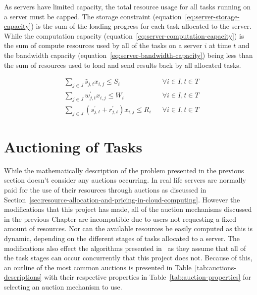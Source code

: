 As servers have limited capacity, the total resource usage for all tasks running on a server must be capped.
The storage constraint (equation~\eqref{eq:server-storage-capacity}) is the sum of the loading progress for
each task allocated to the server. While the computation capacity (equation~\eqref{eq:server-computation-capacity}) is
the sum of compute resources used by all of the tasks on a server $i$ at time $t$ and the bandwidth capacity
(equation~\eqref{eq:server-bandwidth-capacity}) being less than the sum of resources used to load and send results back
by all allocated tasks.

\begin{align}
    & \sum_{j \in J} \hat{s}_{j,t} x_{i,j} \leq S_i && \forall{i \in I, t \in T} \label{eq:server-storage-capacity} \\
    & \sum_{j \in J} w^{'}_{j,t} x_{i,j} \leq W_i && \forall{i \in I, t \in T} \label{eq:server-computation-capacity} \\
    & \sum_{j \in J} (s^{'}_{j,t} + r^{'}_{j,t}) x_{i,j} \leq R_i && \forall{i \in I, t \in T} \label{eq:server-bandwidth-capacity}
\end{align}

\section{Auctioning of Tasks}
\label{sec:auctioning-of-tasks}
While the mathematically description of the problem presented in the previous section doesn't consider any auctions
occurring. In real life servers are normally paid for the use of their resources through auctions as discussed in
Section~\ref{sec:resource-allocation-and-pricing-in-cloud-computing}. However the modifications
that this project has made, all of the auction mechanisms discussed in the previous Chapter are incompatible
due to users not requesting a fixed amount of resources. Nor can the available resources be easily computed as this is
dynamic, depending on the different stages of tasks allocated to a server. The modifications also effect the algorithms
presented in~\cite{FlexibleResourceAllocation} as they assume that all of the task stages can occur concurrently that
this project does not. Because of this, an outline of the most common auctions is presented in
Table~\ref{tab:auctions-descriptions} with their respective properties in Table~\ref{tab:auction-properties} for
selecting an auction mechanism to use.

